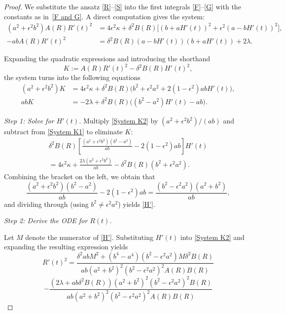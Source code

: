 \documentclass[12pt]{amsart}
\begin{document}
\begin{proof}
We substitute the ansatz \eqref{R}--\eqref{S} into the first
integrals \eqref{F}--\eqref{G} with the constants as
in~\eqref{F and G}. A
direct computation gives the system: 
\begin{align*}
(a^{2}+\epsilon^{2}b^{2})A(R)R'(t)^{2}
&= 4\epsilon^{2}\kappa
  + \delta^{2}B(R)\bigl[(b+aH'(t))^{2}
  + \epsilon^{2}(a-bH'(t))^{2}\bigr], \\
-abA(R)R'(t)^{2}
&= \delta^{2}B(R)(a-bH'(t))(b+aH'(t)) + 2\lambda. 
\end{align*}

Expanding the quadratic expressions and introducing the shorthand
\[
K := A(R)R'(t)^{2} - \delta^{2}B(R)H'(t)^{2},
\]
the system turns into the following equations
\begin{align}
(a^{2}+\epsilon^{2}b^{2})K
&= 4\epsilon^{2}\kappa
  + \delta^{2}B(R)\bigl(b^{2}+\epsilon^{2}a^{2}
  + 2(1-\epsilon^{2})abH'(t)\bigr), \label{System K1}\\
abK
&= -2\lambda
  + \delta^{2}B(R)\bigl((b^{2}-a^{2})H'(t) - ab\bigr). \label{System K2}
\end{align}

\noindent\textit{Step 1: Solve for $H'(t)$.}
Multiply \eqref{System K2} by $(a^2+\epsilon^2 b^2)/(ab)$ and
subtract from \eqref{System K1} to eliminate $K$:
\begin{align*}
\delta^2 B(R)
\left[
  \frac{(a^2+\epsilon^2 b^2)(b^2-a^2)}{ab}
  - 2(1-\epsilon^2)ab
\right] H'(t)
\\
= 4\epsilon^2\kappa
  + \frac{2\lambda(a^2+\epsilon^2 b^2)}{ab}
  - \delta^2 B(R)(b^2+\epsilon^2 a^2).
\end{align*}
Combining the bracket on the left, we obtain that
\[
\frac{(a^2+\epsilon^2 b^2)(b^2-a^2)}{ab} - 2(1-\epsilon^2)ab
= \frac{(b^2-\epsilon^2 a^2)(a^2+b^2)}{ab},
\]
and dividing through (using $b^2 \neq \epsilon^2 a^2$)
yields \eqref{H'}.

\noindent\textit{Step 2: Derive the ODE for $R(t)$.}

Let \(M\) denote the numerator of \eqref{H'}. Substituting \(H'(t)\) into \eqref{System K2}
		and expanding the resulting expression yields
		\[
		R'(t)^2 = \frac
		{\delta^2abM^2 + (b^4 - a^4)(b^2 - \epsilon^2a^2)M\delta^2B(R)}
		{ab(a^2 + b^2)^2(b^2 - \epsilon^2a^2)^2A(R)B(R)}
		\]
		\[
		- \frac{ 
			\left(
			2\lambda + ab\delta^2B(R)
			\right)
			(a^2 + b^2)^2
			(b^2 - \epsilon^2a^2)^2B(R)
		}
		{ab(a^2 + b^2)^2(b^2 - \epsilon^2a^2)^2A(R)B(R)}
		\]
		

\end{proof}
\end{document}
